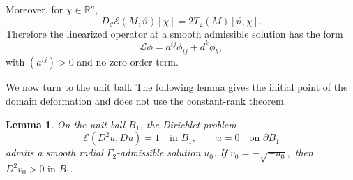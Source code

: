 \documentclass{article}
\newtheorem{lemma}[theorem]{Lemma}
\numberwithin{equation}{section}
\begin{document}
Moreover, for $\chi\in\mathbb R^n$,
\[
D_\vartheta\mathcal E(M,\vartheta)[\chi]
=
2T_2(M)[\vartheta,\chi].
\]
Therefore the linearized operator at a smooth admissible solution has
the form
\begin{equation}\label{eq:real-linearized}
\mathcal L\phi=a^{ij}\phi_{ij}+d^k\phi_k,
\end{equation}
with $(a^{ij})>0$ and no zero-order term.

We now turn to the unit ball. The following lemma gives the initial
point of the domain deformation and does not use the constant-rank
theorem.

\begin{lemma}
\label{lem:real-ball}
On the unit ball $B_1$, the Dirichlet problem
\[
\mathcal E(D^2u,Du)=1
\quad\text{in }B_1,
\qquad
u=0
\quad\text{on }\partial B_1
\]
admits a smooth radial $\Gamma_2$-admissible solution $u_0$.
If
$v_0=-\sqrt{-u_0},$
then
$D^2v_0>0\,\,\text{in }B_1.$
\end{lemma}
\end{document}
